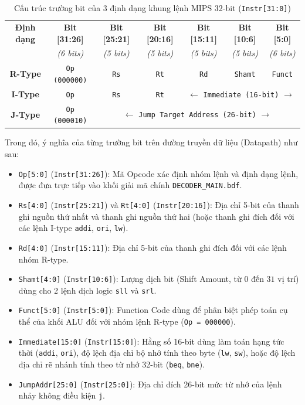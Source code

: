 \documentclass[12pt,a4paper]{report}
\begin{document}
\begin{table}[H]
\centering
\caption{Cấu trúc trường bit của 3 định dạng khung lệnh MIPS 32-bit (\texttt{Instr[31:0]})}
\label{tab:instruction_formats_ch2}
\begin{tabular}{@{}ccccccc@{}}
\toprule
\textbf{Định dạng} & \textbf{Bit [31:26]} & \textbf{Bit [25:21]} & \textbf{Bit [20:16]} & \textbf{Bit [15:11]} & \textbf{Bit [10:6]} & \textbf{Bit [5:0]} \\
 & \textit{(6 bits)} & \textit{(5 bits)} & \textit{(5 bits)} & \textit{(5 bits)} & \textit{(5 bits)} & \textit{(6 bits)} \\ \midrule
\textbf{R-Type} & \texttt{Op (000000)} & \texttt{Rs} & \texttt{Rt} & \texttt{Rd} & \texttt{Shamt} & \texttt{Funct} \\
\textbf{I-Type} & \texttt{Op} & \texttt{Rs} & \texttt{Rt} & \multicolumn{3}{c}{$\longleftarrow$ \texttt{Immediate (16-bit)} $\longrightarrow$} \\
\textbf{J-Type} & \texttt{Op (000010)} & \multicolumn{5}{c}{$\longleftarrow$ \texttt{Jump Target Address (26-bit)} $\longrightarrow$} \\ \bottomrule
\end{tabular}
\end{table}

Trong đó, ý nghĩa của từng trường bit trên đường truyền dữ liệu (Datapath) như sau:
\begin{itemize}
    \item \texttt{Op[5:0]} (\texttt{Instr[31:26]}): Mã Opcode xác định nhóm lệnh và định dạng lệnh, được đưa trực tiếp vào khối giải mã chính \texttt{DECODER\_MAIN.bdf}.
    \item \texttt{Rs[4:0]} (\texttt{Instr[25:21]}) và \texttt{Rt[4:0]} (\texttt{Instr[20:16]}): Địa chỉ 5-bit của thanh ghi nguồn thứ nhất và thanh ghi nguồn thứ hai (hoặc thanh ghi đích đối với các lệnh I-type \texttt{addi}, \texttt{ori}, \texttt{lw}).
    \item \texttt{Rd[4:0]} (\texttt{Instr[15:11]}): Địa chỉ 5-bit của thanh ghi đích đối với các lệnh nhóm R-type.
    \item \texttt{Shamt[4:0]} (\texttt{Instr[10:6]}): Lượng dịch bit (Shift Amount, từ $0$ đến $31$ vị trí) dùng cho 2 lệnh dịch logic \texttt{sll} và \texttt{srl}.
    \item \texttt{Funct[5:0]} (\texttt{Instr[5:0]}): Function Code dùng để phân biệt phép toán cụ thể của khối ALU đối với nhóm lệnh R-type (\texttt{Op = 000000}).
    \item \texttt{Immediate[15:0]} (\texttt{Instr[15:0]}): Hằng số 16-bit dùng làm toán hạng tức thời (\texttt{addi}, \texttt{ori}), độ lệch địa chỉ bộ nhớ tính theo byte (\texttt{lw}, \texttt{sw}), hoặc độ lệch địa chỉ rẽ nhánh tính theo từ nhớ 32-bit (\texttt{beq}, \texttt{bne}).
    \item \texttt{JumpAddr[25:0]} (\texttt{Instr[25:0]}): Địa chỉ đích 26-bit mức từ nhớ của lệnh nhảy không điều kiện \texttt{j}.
\end{itemize}
\end{document}
